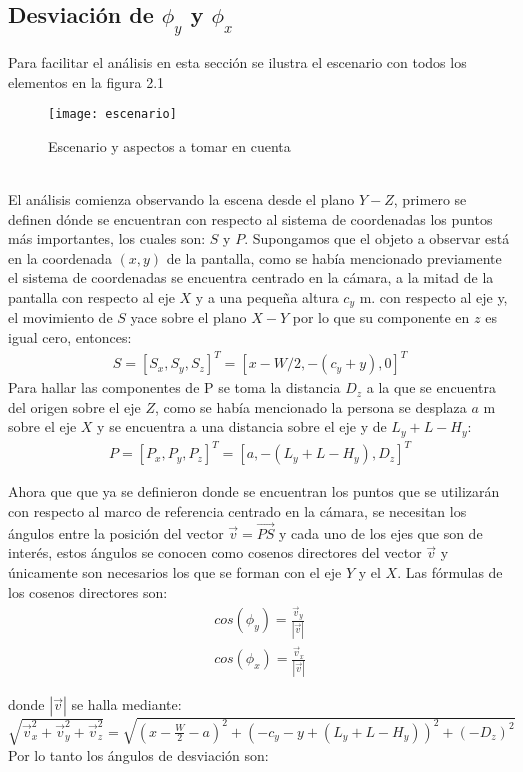 \documentclass[paper=a4, fontsize=11pt]{scrartcl} %
\numberwithin{equation}{section} %
\numberwithin{figure}{section} %
\numberwithin{table}{section} %
\begin{document}
\subsection{Desviación de $\phi_y$ y $\phi_x$}
Para facilitar el análisis en esta sección se ilustra el escenario con todos los elementos en la figura 2.1
\begin{figure}[htbp]
	\centering
	\texttt{[image: escenario]}
	\caption{Escenario y aspectos a tomar en cuenta}\label{fig: figura}
\end{figure}
\\El análisis comienza observando la escena desde el plano $Y-Z$, primero se definen dónde se encuentran con respecto al sistema de coordenadas los puntos más importantes, los cuales son: $S$ y $P$. Supongamos que el objeto a observar está en la coordenada $(x,y)$ de la pantalla, como se había mencionado previamente el sistema de coordenadas se encuentra centrado en la cámara,  a la mitad de la pantalla con respecto al eje $X$ y a una pequeña altura $c_y$ m. con respecto al eje y, el movimiento de $S$ yace sobre el plano $X-Y$ por lo que su componente en $z$ es igual cero, entonces:
\begin{eqnarray}
S= [S_x, S_y, S_z]^T= [x-W/2, -(c_y+y), 0]^T
 \end{eqnarray}
Para hallar las componentes de P se toma la distancia $D_z$ a la que se encuentra del origen sobre el eje $Z$, como se había mencionado la persona se desplaza $a$ m sobre el eje $X$ y se encuentra a una distancia sobre el eje y de $L_y+L-H_y$:
\begin{eqnarray}
 P=[P_x, P_y, P_z]^T= [a, -(L_y+L-H_y), D_z]^T
 \end{eqnarray}
 
 Ahora que que ya se definieron donde se encuentran los puntos que se utilizarán con respecto al marco de referencia centrado en la cámara, se necesitan los ángulos entre la posición del vector $\vec v=\vec {PS}$ y cada uno de los ejes que son de interés, estos ángulos se conocen como cosenos directores del vector $\vec v$ y únicamente son necesarios los que se forman con el eje $Y$ y el $X$.
 Las fórmulas de los cosenos directores son:
 \begin{eqnarray}
 cos(\phi_y)=\frac{\vec v_y}{|\vec v|}\\
  cos(\phi_x)=\frac{\vec v_x}{|\vec v|}
  \end{eqnarray}
 
  donde $|\vec v|$ se halla mediante: $\sqrt{\vec v_{x}^2+\vec v_{y}^2+\vec v_{z}^2}=\sqrt{(x-\frac{W}{2}-a)^2+(-c_y-y+(L_y+L-H_y))^2+(-D_z)^2}$
  \\Por lo tanto los ángulos de desviación son:
  
\end{document}
